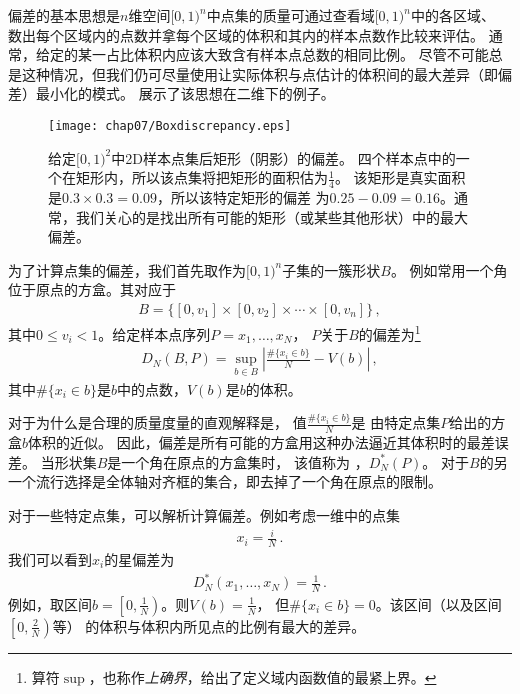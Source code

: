 偏差的基本思想是$n$维空间$[0,1)^n$中点集的质量可通过查看域$[0,1)^n$中的各区域、
数出每个区域内的点数并拿每个区域的体积和其内的样本点数作比较来评估。
通常，给定的某一占比体积内应该大致含有样本点总数的相同比例。
尽管不可能总是这种情况，但我们仍可尽量使用让实际体积与点估计的体积间的最大差异（即偏差）最小化的模式。
展示了该思想在二维下的例子。
\begin{figure}[htbp]
    \centering\texttt{[image: chap07/Boxdiscrepancy.eps]}
    \caption{给定$[0,1)^2$中2D样本点集后矩形（阴影）的偏差。
    四个样本点中的一个在矩形内，所以该点集将把矩形的面积估为$\frac{1}{4}$。
    该矩形是真实面积是$0.3\times0.3=0.09$，所以该特定矩形的偏差
    为$0.25-0.09=0.16$。通常，我们关心的是找出所有可能的矩形（或某些其他形状）中的最大偏差。}
    \label{fig:7.15}
\end{figure}

为了计算点集的偏差，我们首先取作为$[0,1)^n$子集的一簇形状$B$。
例如常用一个角位于原点的方盒。其对应于
\begin{align*}
    B=\{[0,v_1]\times[0,v_2]\times\cdots\times[0,v_n]\}\, ,
\end{align*}
其中$0\le v_i<1$。给定样本点序列$P=x_1,\ldots,x_N$，
$P$关于$B$的偏差为\footnote{算符$\sup$，也称作\emph{上确界}，给出了定义域内函数值的最紧上界。}
\begin{align}\label{eq:7.4}
    D_N(B,P)=\sup\limits_{b\in B}\left|\frac{\#\{x_i\in b\}}{N}-V(b)\right|\, ,
\end{align}
其中$\#\{x_i\in b\}$是$b$中的点数，$V(b)$是$b$的体积。

对于为什么是合理的质量度量的直观解释是，
值$\displaystyle\frac{\#\{x_i\in b\}}{N}$是
由特定点集$P$给出的方盒$b$体积的近似。
因此，偏差是所有可能的方盒用这种办法逼近其体积时的最差误差。
当形状集$B$是一个角在原点的方盒集时，
该值称为
，$D^*_N(P)$。
对于$B$的另一个流行选择是全体轴对齐框的集合，即去掉了一个角在原点的限制。

对于一些特定点集，可以解析计算偏差。例如考虑一维中的点集
\begin{align*}
    x_i=\frac{i}{N}\, .
\end{align*}
我们可以看到$x_i$的星偏差为
\begin{align*}
    D^*_N(x_1,\ldots,x_N)=\frac{1}{N}\, .
\end{align*}
例如，取区间$b=\displaystyle\left[0,\frac{1}{N}\right)$。则$V(b)=\displaystyle\frac{1}{N}$，
但$\#\{x_i\in b\}=0$。该区间（以及区间$\displaystyle\left[0,\frac{2}{N}\right)$等）
的体积与体积内所见点的比例有最大的差异。

